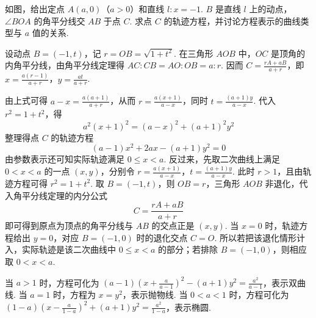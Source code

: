 \documentclass[UTF8,a4paper,oneside,11pt]{ctexbook}
\begin{document}
\begin{problem}
如图，给出定点 \(A(a,0)\)（\(a>0\)）和直线 \(l\colon x=-1\). \(B\) 是直线 \(l\) 上的动点，\(\angle BOA\) 的角平分线交 \(AB\) 于点 \(C\). 求点 \(C\) 的轨迹方程，并讨论方程表示的曲线类型与 \(a\) 值的关系.

\end{problem}

\begin{solution}
设动点 \(B=(-1,t)\)，记 \(r=OB=\sqrt{1+t^2}\). 在三角形 \(AOB\) 中，\(OC\) 是顶角的内角平分线，由角平分线定理得 \(AC:CB=AO:OB=a:r\). 因而 \(C=\frac{rA+aB}{a+r}\)，即 \(x=\frac{a(r-1)}{a+r}\)，\(y=\frac{at}{a+r}\).

由上式可得 \(a-x=\frac{a(a+1)}{a+r}\)，从而 \(r=\frac{a(x+1)}{a-x}\)，同时 \(t=\frac{(a+1)y}{a-x}\). 代入 \(r^2=1+t^2\)，得
\[
a^2(x+1)^2=(a-x)^2+(a+1)^2y^2
\]
整理得点 \(C\) 的轨迹方程
\[
(a-1)x^2+2ax-(a+1)y^2=0
\]
由参数表示还可知实际轨迹满足 \(0\leqslant x<a\). 反过来，先取二次曲线上满足 \(0<x<a\) 的一点 \((x,y)\)，分别令
\(r=\frac{a(x+1)}{a-x}\)，\(t=\frac{(a+1)y}{a-x}\).
此时 \(r>1\)，且由轨迹方程可得 \(r^2=1+t^2\). 取 \(B=(-1,t)\)，则 \(OB=r\)，三角形 \(AOB\) 非退化，代入角平分线定理的内分公式
\[
C=\frac{rA+aB}{a+r}
\]
即可得到原点为顶点的角平分线与 \(AB\) 的交点正是 \((x,y)\). 当 \(x=0\) 时，轨迹方程给出 \(y=0\)，对应 \(B=(-1,0)\) 时的退化交点 \(C=O\). 所以若把该退化情形计入，实际轨迹是该二次曲线中 \(0\leqslant x<a\) 的部分；若排除 \(B=(-1,0)\)，则相应取 \(0<x<a\).

当 \(a>1\) 时，方程可化为 \((a-1)\left(x+\frac{a}{a-1}\right)^2-(a+1)y^2=\frac{a^2}{a-1}\)，表示双曲线. 当 \(a=1\) 时，方程为 \(x=y^2\)，表示抛物线. 当 \(0<a<1\) 时，方程可化为 \((1-a)\left(x-\frac{a}{1-a}\right)^2+(a+1)y^2=\frac{a^2}{1-a}\)，表示椭圆.
\end{solution}

\end{document}
